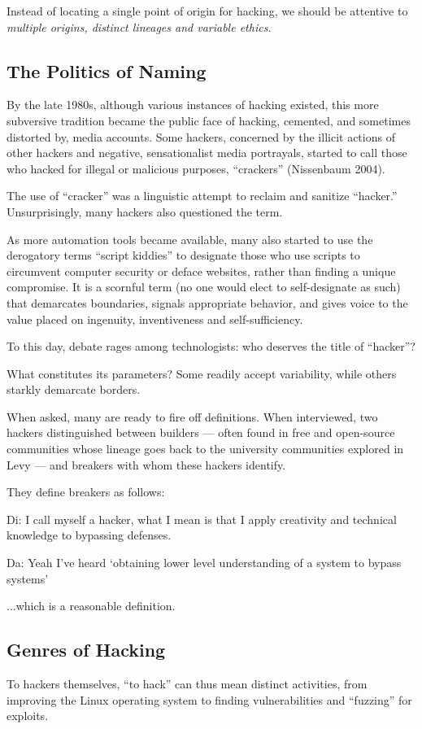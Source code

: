 \documentclass[letterpaper,12pt,english]{sphinxmanual}
\begin{document}
Instead of
locating a
single point of origin
for hacking, we should be attentive to \emph{multiple origins, distinct lineages and variable ethics.}


\subsection{The Politics of Naming}
\label{preface:the-politics-of-naming}
By the late 1980s, although various instances of hacking existed,
this more subversive
tradition became
the
public face of hacking, cemented, and sometimes distorted
by, media
accounts.
Some
hackers,
concerned
by
the
illicit
actions
of
other
hackers
and
negative,
sensationalist
media
portrayals,
started
to
call those who hacked for illegal or malicious purposes,
“crackers”
(Nissenbaum
2004).

The use of “cracker” was a
linguistic attempt to reclaim and sanitize
“hacker.” Unsurprisingly, many hackers also questioned the term.

As more automation tools became available, many also started to use the derogatory terms “script kiddies” to designate those who use scripts to circumvent computer security or deface websites, rather than finding a unique
compromise. It is a scornful term (no one would elect to self-designate as such) that demarcates boundaries, signals appropriate behavior, and gives voice to the value placed on ingenuity, inventiveness and self-sufficiency.

To this day, debate rages among technologists: who deserves the title of “hacker”?

What constitutes its parameters? Some readily accept variability, while others starkly demarcate borders.

When asked, many
are
ready
to
fire
off
definitions.
When
interviewed,
two
hackers distinguished
between
builders — often
found
in
free
and
open-source
communities
whose
lineage
goes
back
to
the
university
communities explored in Levy — and
breakers
with
whom
these hackers
identify.

They
define breakers as follows:

Di: I call
myself
a
hacker,
what
I
mean
is
that
I
apply
creativity
and
technical
knowledge
to
bypassing
defenses.

Da: Yeah I’ve
heard `obtaining lower level understanding
of a system
to bypass
systems'

...which
is
a
reasonable
definition.


\subsection{Genres of Hacking}
\label{preface:genres-of-hacking}
To
hackers
themselves,
“to
hack”
can
thus
mean
distinct
activities,
from
improving
the
Linux
operating
system
to
finding
vulnerabilities
and “fuzzing” for
exploits.
\end{document}
